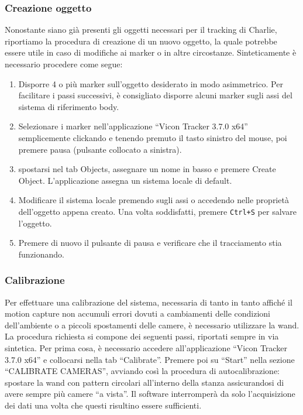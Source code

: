 \subsubsection*{Creazione oggetto}
\label{sez:Sistema Vicon_oggetto}
Nonostante siano già presenti gli oggetti necessari per il tracking di Charlie, riportiamo la procedura di creazione di un nuovo oggetto, la quale potrebbe essere
utile in caso di modifiche ai marker o in altre circostanze. 
Sinteticamente è necessario procedere come segue:
\begin{enumerate}
	\item Disporre 4 o più marker sull'oggetto desiderato in modo asimmetrico. Per facilitare i passi successivi, è consigliato disporre alcuni marker sugli assi 
	del sistema di riferimento body.
	
	\item Selezionare i marker nell'applicazione ``Vicon Tracker 3.7.0 x64'' semplicemente clickando e tenendo premuto il tasto sinistro del mouse, poi premere 
	pausa (pulsante collocato a sinistra).
	
	\item spostarsi nel tab Objects, assegnare un nome in basso e premere Create Object. L'applicazione assegna un sistema locale di default.
	
	\item Modificare il sistema locale premendo sugli assi o accedendo nelle proprietà dell'oggetto appena creato. Una volta soddisfatti, premere \texttt{Ctrl+S} 
	per salvare l'oggetto.
	
	\item Premere di nuovo il pulsante di pausa e verificare che il tracciamento stia funzionando.
\end{enumerate}
           
\subsubsection*{Calibrazione}
Per effettuare una calibrazione del sistema, necessaria di tanto in tanto affiché il motion capture non accumuli errori dovuti a cambiamenti delle condizioni 
dell'ambiente o a piccoli spostamenti delle camere, è necessario utilizzare la wand. 
La procedura richiesta si compone dei seguenti passi, riportati sempre in via sintetica. Per prima cosa, è necessario accedere all'applicazione 
``Vicon Tracker 3.7.0 x64'' e collocarsi nella tab ``Calibrate''. 
Premere poi su ``Start'' nella sezione ``CALIBRATE CAMERAS'', avviando così la procedura di autocalibrazione: spostare la wand con pattern circolari 
all'interno della stanza assicurandosi di avere sempre più camere ``a vista''. 
Il software interromperà da solo l'acquisizione dei dati una volta che questi risultino essere sufficienti.

